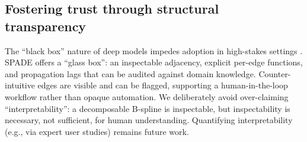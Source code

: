 \subsection{Fostering trust through structural transparency}
The ``black box'' nature of deep models impedes adoption in high-stakes settings
\citep{Rudin2019}. SPADE offers a ``glass box'': an inspectable adjacency,
explicit per-edge functions, and propagation lags that can be audited against
domain knowledge. Counter-intuitive edges are visible and can be flagged,
supporting a human-in-the-loop workflow rather than opaque automation. We
deliberately avoid over-claiming ``interpretability'': a decomposable B-spline is
inspectable, but inspectability is necessary, not sufficient, for human
understanding. Quantifying interpretability (e.g., via expert user studies)
remains future work.

